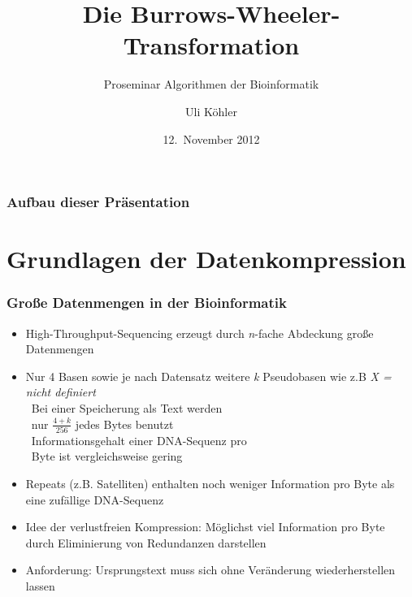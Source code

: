 \documentclass[14pt,xcolor=dvipsnames,pdftex]{beamer}
\title{Die Burrows-Wheeler-Transformation}
\subtitle{Proseminar \glqq Algorithmen der Bioinformatik\grqq}
\author{Uli Köhler}
\date{12.~November 2012}
\begin{document}
\frame{\titlepage}
\begin{frame}
\frametitle{Aufbau dieser Präsentation}
\tableofcontents
\end{frame}

\section{Grundlagen der Datenkompression}
\begin{frame}[allowframebreaks]
\frametitle{Große Datenmengen in der Bioinformatik}
  \begin{itemize}
   \item High-Throughput-Sequencing erzeugt durch \textit{n}-fache Abdeckung große Datenmengen
   \item Nur 4 Basen  sowie je nach Datensatz weitere \textit{k} Pseudobasen wie z.B \textit{X = nicht definiert}\\
   \textrightarrow\ Bei einer Speicherung als Text werden\\\quad\ nur $\frac{4+k}{256}$ jedes Bytes benutzt\\
   \textrightarrow\ Informationsgehalt einer DNA-Sequenz pro\\\quad\ Byte ist vergleichsweise gering
  \end{itemize}
\framebreak
\begin{itemize}
 \item Repeats (z.B. Satelliten) enthalten noch weniger Information pro Byte als eine zufällige DNA-Sequenz
 \item Idee der verlustfreien Kompression: Möglichst viel Information pro Byte durch Eliminierung von Redundanzen darstellen
 \item Anforderung: Ursprungstext muss sich ohne Veränderung wiederherstellen lassen
\end{itemize}

\end{frame}
\end{document}
